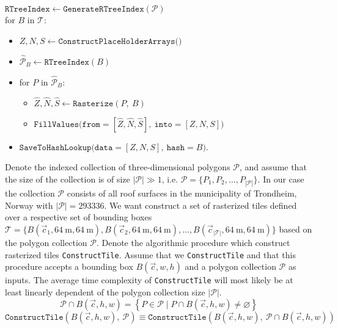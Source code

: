 \begin{leftbar}
\noindent $\texttt{RTreeIndex} \leftarrow \texttt{GenerateRTreeIndex}(\mathcal{P})$\\
for $B$ in $\mathcal{T}$:
  \begin{itemize}[nosep,label=]
    \item $Z, N, S \leftarrow \texttt{ConstructPlaceHolderArrays()}$
    \item $\hat{\mathcal{P}}_B \leftarrow \texttt{RTreeIndex}(B)$
    \item for $P$ in $\hat{\mathcal{P}}_B$:
    \begin{itemize}[nosep,label=]
      \item $\hat{Z}, \hat{N}, \hat{S} \leftarrow \texttt{Rasterize}(P,~B)$
      \item $\texttt{FillValues(from}=[\hat{Z}, \hat{N}, \hat{S}],~\texttt{into}=[Z, N, S])$
    \end{itemize}
  \item $\texttt{SaveToHashLookup(data}=[Z, N, S],~\texttt{hash}=B)$.
  \end{itemize}
\end{leftbar}

Denote the indexed collection of three-dimensional polygons $\mathcal{P}$, and assume that the size of the collection is of size $|\mathcal{P}| \gg 1$, i.e. $\mathcal{P} = \{P_1, P_2, \dots, P_{|\mathcal{P}|} \}$.
In our case the collection $\mathcal{P}$ consists of all roof surfaces in the municipality of Trondheim, Norway with $|\mathcal{P}| = \num{293336}$.
We want construct a set of rasterized tiles defined over a respective set of bounding boxes $\mathcal{T} = \{B(\vec{c}_1, \SI{64}{\meter}, \SI{64}{\meter}), B(\vec{c}_2, \SI{64}{\meter}, \SI{64}{\meter}),\allowbreak \dots,\allowbreak B(\vec{c}_{|\mathcal{T}|}, \SI{64}{\meter}, \SI{64}{\meter}) \}$ based on the polygon collection $\mathcal{P}$.
Denote the algorithmic procedure which construct rasterized tiles \texttt{ConstructTile}.
Assume that we \texttt{ConstructTile} and that this procedure accepts a bounding box $B(\vec{c}, w, h)$ and a polygon collection $\mathcal{P}$ as inputs.
The average time complexity of \texttt{ConstructTile} will most likely be at least linearly dependent of the polygon collection size $|\mathcal{P}|$.
%
\begin{equation*}
  \mathcal{P} \cap B(\vec{c}, h, w)
  =
  \left\{
    P \in \mathcal{P} \mid P \cap B(\vec{c}, h, w) \neq \varnothing
  \right\}
\end{equation*}
%
\begin{equation*}
  \texttt{ConstructTile}(B(\vec{c}, h, w),~\mathcal{P})
  \equiv
  \texttt{ConstructTile}(B(\vec{c}, h, w),~\mathcal{P} \cap B(\vec{c}, h, w))
\end{equation*}

